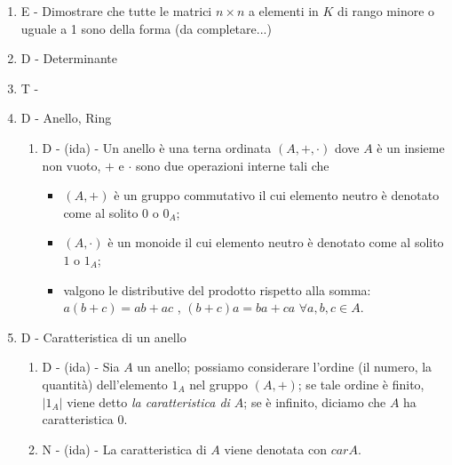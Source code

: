 \documentclass[]{article}
\begin{document}
\begin{enumerate}
	\item E - Dimostrare che tutte le matrici $n \times n$ a elementi in $K$ di rango minore o uguale a 1 sono della forma 	(da completare...)
	

	          
	\item D - Determinante	
	\item T - 
	
	\item D - Anello, Ring
			  \begin{enumerate}
			  	\item D - (ida) - Un anello \`e una terna ordinata $(A, +, \cdot)$ dove $A$ \`e un insieme non vuoto, $+$ e $\cdot$ sono due operazioni interne tali che
			  		              \begin{itemize}
			  		              	\item $(A, +)$ \`e un gruppo commutativo il cui elemento neutro \`e denotato come al solito $0$ o $0_A$;
			  		              	\item $(A, \cdot)$ \`e un monoide il cui elemento neutro \`e denotato come al solito $1$ o $1_A$;
			  		              	\item valgono le distributive del prodotto rispetto alla somma: \\
			  		              	      $a(b+c)=ab+ac$ , $(b+c)a=ba+ca$ $\forall a, b, c \in A$. 
			  		              \end{itemize}
			  \end{enumerate}
	
	\item D - Caratteristica di un anello
			  \begin{enumerate}
			  	\item D - (ida) - Sia $A$ un anello; possiamo considerare l'ordine (il numero, la quantit\`a) dell'elemento $1_A$ nel gruppo $(A,+)$; se tale ordine \`e finito, $|1_A|$ viene detto \emph{la caratteristica di $A$}; se \`e infinito, diciamo che $A$ ha caratteristica $0$. 
			  	\item N - (ida) - La caratteristica di $A$ viene denotata con $car A$.
			  \end{enumerate}
		  

\end{enumerate}
\end{document}
